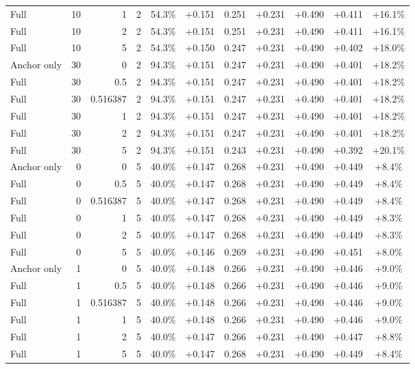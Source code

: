 \begin{table}[htbp]
\begin{tabular}{lrrrccccccc}
Full & 10 & 1 & 2 & 54.3\% & +0.151 & 0.251 & +0.231 & +0.490 & +0.411 & +16.1\% \\
Full & 10 & 2 & 2 & 54.3\% & +0.151 & 0.251 & +0.231 & +0.490 & +0.411 & +16.1\% \\
Full & 10 & 5 & 2 & 54.3\% & +0.150 & 0.247 & +0.231 & +0.490 & +0.402 & +18.0\% \\
Anchor only & 30 & 0 & 2 & 94.3\% & +0.151 & 0.247 & +0.231 & +0.490 & +0.401 & +18.2\% \\
Full & 30 & 0.5 & 2 & 94.3\% & +0.151 & 0.247 & +0.231 & +0.490 & +0.401 & +18.2\% \\
Full & 30 & 0.516387 & 2 & 94.3\% & +0.151 & 0.247 & +0.231 & +0.490 & +0.401 & +18.2\% \\
Full & 30 & 1 & 2 & 94.3\% & +0.151 & 0.247 & +0.231 & +0.490 & +0.401 & +18.2\% \\
Full & 30 & 2 & 2 & 94.3\% & +0.151 & 0.247 & +0.231 & +0.490 & +0.401 & +18.2\% \\
Full & 30 & 5 & 2 & 94.3\% & +0.151 & 0.243 & +0.231 & +0.490 & +0.392 & +20.1\% \\
Anchor only & 0 & 0 & 5 & 40.0\% & +0.147 & 0.268 & +0.231 & +0.490 & +0.449 & +8.4\% \\
Full & 0 & 0.5 & 5 & 40.0\% & +0.147 & 0.268 & +0.231 & +0.490 & +0.449 & +8.4\% \\
Full & 0 & 0.516387 & 5 & 40.0\% & +0.147 & 0.268 & +0.231 & +0.490 & +0.449 & +8.4\% \\
Full & 0 & 1 & 5 & 40.0\% & +0.147 & 0.268 & +0.231 & +0.490 & +0.449 & +8.3\% \\
Full & 0 & 2 & 5 & 40.0\% & +0.147 & 0.268 & +0.231 & +0.490 & +0.449 & +8.3\% \\
Full & 0 & 5 & 5 & 40.0\% & +0.146 & 0.269 & +0.231 & +0.490 & +0.451 & +8.0\% \\
Anchor only & 1 & 0 & 5 & 40.0\% & +0.148 & 0.266 & +0.231 & +0.490 & +0.446 & +9.0\% \\
Full & 1 & 0.5 & 5 & 40.0\% & +0.148 & 0.266 & +0.231 & +0.490 & +0.446 & +9.0\% \\
Full & 1 & 0.516387 & 5 & 40.0\% & +0.148 & 0.266 & +0.231 & +0.490 & +0.446 & +9.0\% \\
Full & 1 & 1 & 5 & 40.0\% & +0.148 & 0.266 & +0.231 & +0.490 & +0.446 & +9.0\% \\
Full & 1 & 2 & 5 & 40.0\% & +0.147 & 0.266 & +0.231 & +0.490 & +0.447 & +8.8\% \\
Full & 1 & 5 & 5 & 40.0\% & +0.147 & 0.268 & +0.231 & +0.490 & +0.449 & +8.4\% \\

\end{tabular}
\end{table}
